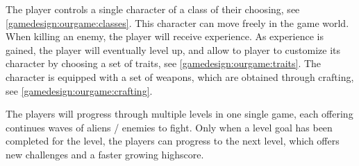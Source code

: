 The player controls a single character of a class of their choosing, see \ref{gamedesign:ourgame:classes}. 
This character can move freely in the game world.
When killing an enemy, the player will receive experience.
As experience is gained, the player will eventually level up, and allow to player to customize its character by choosing a set of traits, see \ref{gamedesign:ourgame:traits}.
The character is equipped with a set of weapons, which are obtained through crafting, see \ref{gamedesign:ourgame:crafting}.

The players will progress through multiple levels in one single game, each offering continues waves of aliens / enemies to fight. Only when a level goal has been completed for the level, the players can progress to the next level, which offers new challenges and a faster growing highscore. 

